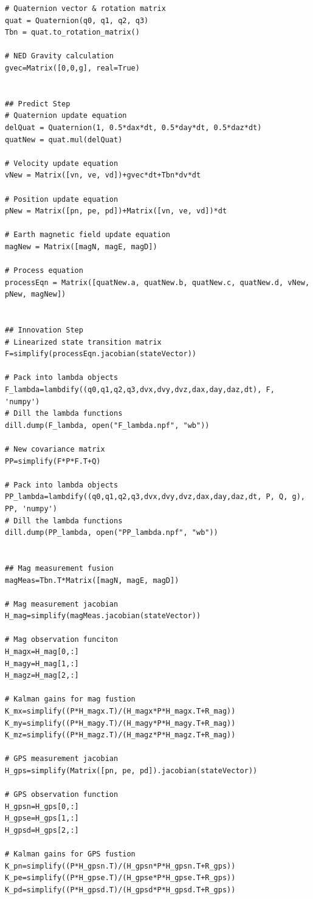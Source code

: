 \begin{lstlisting}
# Quaternion vector & rotation matrix
quat = Quaternion(q0, q1, q2, q3)
Tbn = quat.to_rotation_matrix()

# NED Gravity calculation
gvec=Matrix([0,0,g], real=True)


## Predict Step
# Quaternion update equation
delQuat = Quaternion(1, 0.5*dax*dt, 0.5*day*dt, 0.5*daz*dt)
quatNew = quat.mul(delQuat)

# Velocity update equation
vNew = Matrix([vn, ve, vd])+gvec*dt+Tbn*dv*dt

# Position update equation
pNew = Matrix([pn, pe, pd])+Matrix([vn, ve, vd])*dt

# Earth magnetic field update equation
magNew = Matrix([magN, magE, magD])

# Process equation
processEqn = Matrix([quatNew.a, quatNew.b, quatNew.c, quatNew.d, vNew, pNew, magNew])


## Innovation Step
# Linearized state transition matrix
F=simplify(processEqn.jacobian(stateVector))

# Pack into lambda objects
F_lambda=lambdify((q0,q1,q2,q3,dvx,dvy,dvz,dax,day,daz,dt), F, 'numpy')
# Dill the lambda functions
dill.dump(F_lambda, open("F_lambda.npf", "wb"))

# New covariance matrix
PP=simplify(F*P*F.T+Q)

# Pack into lambda objects
PP_lambda=lambdify((q0,q1,q2,q3,dvx,dvy,dvz,dax,day,daz,dt, P, Q, g), PP, 'numpy')
# Dill the lambda functions
dill.dump(PP_lambda, open("PP_lambda.npf", "wb"))


## Mag measurement fusion
magMeas=Tbn.T*Matrix([magN, magE, magD])

# Mag measurement jacobian
H_mag=simplify(magMeas.jacobian(stateVector))

# Mag observation funciton
H_magx=H_mag[0,:]
H_magy=H_mag[1,:]
H_magz=H_mag[2,:]

# Kalman gains for mag fustion
K_mx=simplify((P*H_magx.T)/(H_magx*P*H_magx.T+R_mag))
K_my=simplify((P*H_magy.T)/(H_magy*P*H_magy.T+R_mag))
K_mz=simplify((P*H_magz.T)/(H_magz*P*H_magz.T+R_mag))

# GPS measurement jacobian
H_gps=simplify(Matrix([pn, pe, pd]).jacobian(stateVector))

# GPS observation function
H_gpsn=H_gps[0,:]
H_gpse=H_gps[1,:]
H_gpsd=H_gps[2,:]

# Kalman gains for GPS fustion
K_pn=simplify((P*H_gpsn.T)/(H_gpsn*P*H_gpsn.T+R_gps))
K_pe=simplify((P*H_gpse.T)/(H_gpse*P*H_gpse.T+R_gps))
K_pd=simplify((P*H_gpsd.T)/(H_gpsd*P*H_gpsd.T+R_gps))



\end{lstlisting}
